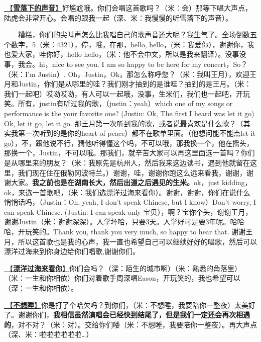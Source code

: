 \documentclass[]{ctexbook}
\begin{document}
\hyperref[sound-of-the-snow]{🎵【\textbf{雪落下的声音}】}好尴尬哦。你们会唱这首歌吗？（米：会）那等下唱大声点，陆虎会非常开心。会唱的跟我一起（深、米：我慢慢的听雪落下的声音）。

  糟糕，你们的尖叫声怎么比我唱自己的歌声音还大呢？我生气了。全场倒数五个数字，5（米：4321），停，哦，在那，hello, hello，(米：我爱你），谢谢你，我也爱大家，哇你好，hello hello，（米：他不会中文，所以是我来翻译）。没事没事，我会。hi，nice to see you. I am so happy to be here for my concert，So？ （米：I'm Justin）. Oh，Justin，Ok，那怎么称呼您？（米：我叫王月），欢迎王月和Justin，你们是从哪里的哇？我们刚才抽到的是谁哇？抽到的是王月。（米：我们一起吧）哎呦哎呦，有人可以一起哦，没事，生米们，我们也一起吧，开玩笑。所有，justin有听过我的歌，（justin：yeah）which one of my songs or performance is the your favorite one? (Justin: Ok, The first I heard was let it go) Ok, let it go, let it go. 那王月第一次听到我的歌，或者说最喜欢是什么歌？（其实我第一次听到的是你的heart of peace）都不在歌单里面。（他想问能不能点let it go），不，跟他说不行，猜他听得懂这个吗，不可以哦，那我换一个，他在摇头，那换一个，Justin，不可以哦。那我们，就辛苦大家可以再这里面选一首吗？你们是从哪里来的朋友？（米：我原先是杭州人，然后我来这边读书，遇到他就留在这里，我们现在住在俄勒冈波特兰。）谢谢，哇，谢谢你跑这么远来看我，谢谢，谢谢大家。\textbf{我之前也是在湖南长大，然后出道之后遇见的生米。}ok，just kidding，ok，来选一首歌吧，（米：我们选漂洋过海来看你）。谢谢，谢谢，你们在说什么悄悄话吗，（Justin：Oh, yeah, I don't speak Chinese, but I know）Don't worry, I can speak Chinese. (Justin: I can speak only 宝贝），啊？宝你个头，谢谢王月，谢谢Justin（米：谢谢深深）。人学坏哈，只要3天。人学好可是要3年呢。哈哈哈，开玩笑的。Thank you, thank you very much, so happy to hear that. 谢谢王月，所以这首歌也是我的心声，我一直也希望自己可以继续好好的唱歌，然后可以漂洋过海来到你身边给你们唱歌,谢谢你们。

\hyperref[across-the-ocean-to-see-you]{🎵【\textbf{漂洋过海来看你}】}你们会吗？（深：陌生的城市啊）（米：熟悉的角落里）（米：一生和你相依）你们对着歌手周深唱Eason，开玩笑的，我也希望可以（深：一生和你相依）。

\hyperref[donot-want-to-sleep]{🎵【\textbf{不想睡}】}你是打了个哈欠吗？到你们，（米：不想睡，我要陪你一整夜）太美好了。谢谢你们，\textbf{我相信虽然演唱会已经快到结尾了，但是我们一定还会再次相遇的}，对不对？（米：对）。交给你们喽（米：不想睡，我要陪你一整夜）。再大声点（深、米：啦啦啦啦啦啦\ldots）
\end{document}
